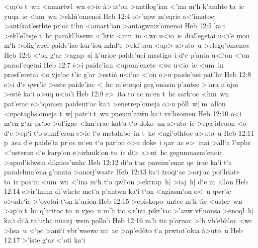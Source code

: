 <up`o
t~wn
<amartwl~wn
e>ic
\r{a}>ut`on
>antilog'ian
<'ina
m`h
k'amhte
ta~ic
yuqa~ic
<um~wn
>ekl\r{u}'omenoi\bibvsend
{}
\vs Heb 12:4
o>'upw
m'eqric
a<'imatoc
>antikat'esthte
pr`oc
t`hn
<amart'ian
>antagwniz'omenoi\bibvsend
\vs Heb 12:5
ka`i
>ekl'elhsje
t~hc
parakl'hsewc
<'htic
<um~in
<wc
u<io~ic
dial'egetai
u<i'e
mou
m`h
>olig'wrei
paide'iac
kur'iou
mhd`e
>ekl'uou
<up>
a>uto~u
>elegq'omenoc\bibvsend
\vs Heb 12:6
<`on
g`ar
>agap~a|
k'urioc
paide'uei
mastigo~i
d`e
p'anta
u<i`on
<`on
parad'eqetai\bibvsend
\vs Heb 12:7
\r{e}>i
paide'ian
<upom'enete
<wc
u<io~ic
<um~in
prosf'eretai
<o
vje`oc
t'ic
g'ar
>estin\r{}
u<i`oc
<`on
o>u
paide'uei
pat'hr\bibvsend
\vs Heb 12:8
e>i
d`e
qwr'ic
>este
paide'iac
<~hc
m'etoqoi
geg'onasin
p'antec
>'ara
n'ojoi
>este\r{}
ka`i
o>uq
u<io'i\bibvsend
\vs Heb 12:9
e>~ita
to`uc
m`en
t~hc
sark`oc
<hm~wn
pat'erac
e>'iqomen
paideut`ac
ka`i
>enetrep'omeja
o>u
p\r{o}ll~w|
m~allon
<upotaghs'omeja
t~w|
patr`i
t~wn
pneum'at\r{w}n
ka`i
vz'hsomen\bibvsend
\vs Heb 12:10
o<i
m`en
g`ar
pr`oc
>ol'igac
<hm'erac
kat`a
t`o
doko~un
a>uto~ic
>epa'ideuon
<o
d`e
>ep`i
t`o
sumf'eron
e>ic
t`o
metalabe~in
t~hc
<agi'othtoc
a>uto~u\bibvsend
\vs Heb 12:11
p~asa
d`e
paide'ia
pr`oc
m`en
t`o
par`on
o>u
doke~i
qar~ac
e>~inai
>all`a
l'uphc
<'usteron
d`e
karp`on
e>irhnik`on
to~ic
di>
a>ut~hc
gegumnasm'enoic
>apod'idwsin
dikaios'unhc\bibvsend
\vs Heb 12:12
di`o
t`ac
pareim'enac
qe~irac
ka`i
t`a
paralelum'ena
g'onata
>anorj'wsate\bibvsend
\vs Heb 12:13
ka`i
troqi`ac
>orj`ac
poi'h\r{s}ate
to~ic
pos`in
<um~wn
<'ina
m`h
t`o
qwl`on
>ektrap~h|
>iaj~h|
d`e
m~allon\bibvsend
\vs Heb 12:14
e>ir'hnhn
di'wkete
met`a
p'antwn
ka`i
t`on
<agiasm`on
o<~u
qwr`ic
o>ude`ic
>'oyetai
t`on
k'urion\bibvsend
\vs Heb 12:15
>episkopo~untec
m'h
tic
<uster~wn
>ap`o
t~hc
q'aritoc
to~u
vjeo~u
m'h
tic
<r'iza
pikr'iac
>'anw
vf'uousa
>enoql~h|
ka`i
di`a\r{}
ta'uthc
mianj~wsin
pollo'i\bibvsend
\vs Heb 12:16
m'h
tic
p'ornoc
>`h
vb'ebhloc
<wc
>hsa~u
<`oc
>ant`i
vbr'wsewc
mi~ac
>ap'ed\r{o}to
t`a
prwtot'okia
\r{a}>uto~u\bibvsend
{}
\vs Heb 12:17
>'iste
g`ar
<'oti
ka`i
